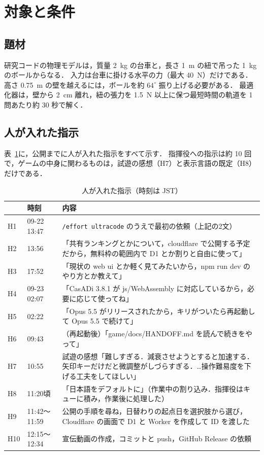 \documentclass[a4paper,10pt]{ltjsarticle}
\newcommand{\tabref}[1]{表~\ref{#1}}
\newcommand{\code}[1]{\texttt{#1}}
\begin{document}
\section{対象と条件}

\subsection{題材}
研究コードの物理モデルは，質量 \SI{2}{kg} の台車と，長さ \SI{1}{m} の紐で吊った \SI{1}{kg} のボールからなる．
入力は台車に掛ける水平の力（最大 \SI{40}{N}）だけである．
高さ \SI{0.75}{m} の壁を越えるには，ボールを約 $64^\circ$ 振り上げる必要がある．
最適化器は，壁から \SI{2}{cm} 離れ，紐の張力を \SI{1.5}{N} 以上に保つ最短時間の軌道を 1 問あたり約 30 秒で解く．

\subsection{人が入れた指示}
\tabref{tab:human}に，公開までに人が入れた指示をすべて示す．
指揮役への指示は約 10 回で，ゲームの中身に関わるものは，試遊の感想（H7）と表示言語の既定（H8）だけである．

\begin{table}[H]
\centering
\caption{人が入れた指示（時刻は JST）}
\label{tab:human}
\small
\begin{tabularx}{\linewidth}{llX}
\toprule
& 時刻 & 内容 \\
\midrule
H1 & 09-22 13:47 & \code{/effort ultracode} のうえで最初の依頼（上記の2文） \\
H2 & 13:56 & 「共有ランキングとかについて，cloudflare で公開する予定だから，無料枠の範囲内で D1 とか割りと自由に使って」 \\
H3 & 17:52 & 「現状の web ui とか軽く見てみたいから，npm run dev のやり方とか教えて」 \\
H4 & 09-23 02:07 & 「CasADi 3.8.1 が js/WebAssembly に対応しているから，必要に応じて使ってね」 \\
H5 & 02:22 & 「Opus 5.5 がリリースされたから，キリがついたら再起動して Opus 5.5 で続けて」 \\
H6 & 09:43 & （再起動後）「game/docs/HANDOFF.md を読んで続きをやって」 \\
H7 & 10:55 & 試遊の感想「難しすぎる．減衰させようとすると加速する．矢印キーだけだと微調整がしづらすぎる．…操作難易度を下げる工夫をしてほしい」 \\
H8 & 11:20頃 & 「日本語をデフォルトに」（作業中の割り込み．指揮役はキューに積み，作業後に処理した） \\
H9 & 11:42〜11:59 & 公開の手順を尋ね，日替わりの起点日を選択肢から選び，Cloudflare の画面で D1 と Worker を作成して ID を渡した \\
H10 & 12:15〜12:34 & 宣伝動画の作成，コミットと push，GitHub Release の依頼 \\
\bottomrule
\end{tabularx}
\end{table}
\end{document}
